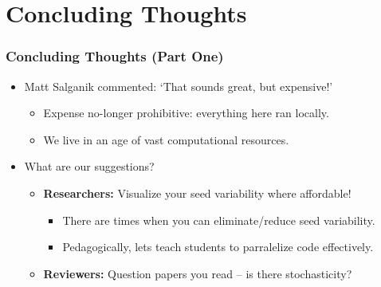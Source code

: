 \documentclass[12pt]{beamer}
\begin{document}


\section{Concluding Thoughts}
\begin{frame}
\frametitle{Concluding Thoughts (Part One)}
\begin{itemize}
\item Matt Salganik commented: `That sounds great, but expensive!'\\ \vspace{.05in}
\begin{itemize}
\item Expense no-longer prohibitive: everything here ran locally.\\ \vspace{.035in}
\item We live in an age of vast computational resources.\pause \\ \vspace{.06in}
\end{itemize}
\item What are our suggestions?\pause \\ \vspace{.06in}
\begin{itemize}
\item \textbf{Researchers:} Visualize your seed variability where affordable!\\ \vspace{.035in}
\begin{itemize}
	\item There are times when you can eliminate/reduce seed variability.\\ \vspace{.04in}
	\item Pedagogically, lets teach students to parralelize code effectively.\\ \vspace{.04in} \pause
\end{itemize}
\item \textbf{Reviewers:} Question papers you read -- is there stochasticity?\pause \\ \vspace{.04in}

\end{itemize}
\end{itemize}
\end{frame}
\end{document}
